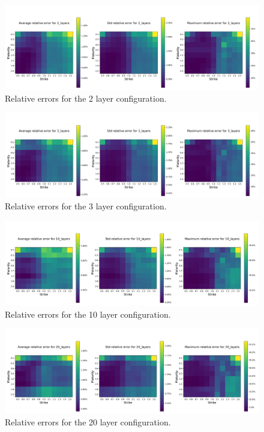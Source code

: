 \documentclass{article}
\theoremstyle{remark}
\begin{document}
\begin{figure}[h!]
  \centering
  \includegraphics[width=\linewidth]{../data/rBergomiTermStructureNNErrors_Model_2_layers_6.png}
  \caption{Relative errors for the 2 layer configuration.}
  \label{fig:2_layers}
\end{figure}

\begin{figure}[h!]
  \centering
  \includegraphics[width=\linewidth]{../data/rBergomiTermStructureNNErrors_Model_3_layers_7.png}
  \caption{Relative errors for the 3 layer configuration.}
  \label{fig:3_layers}
\end{figure}

\begin{figure}[h!]
  \centering
  \includegraphics[width=\linewidth]{../data/rBergomiTermStructureNNErrors_Model_10_layers_2.png}
  \caption{Relative errors for the 10 layer configuration.}
  \label{fig:10_layers}
\end{figure}

\begin{figure}[h!]
  \centering
  \includegraphics[width=\linewidth]{../data/rBergomiTermStructureNNErrors_Model_20_layers_3.png}
  \caption{Relative errors for the 20 layer configuration.}
  \label{fig:20_layers}
\end{figure}
\end{document}
